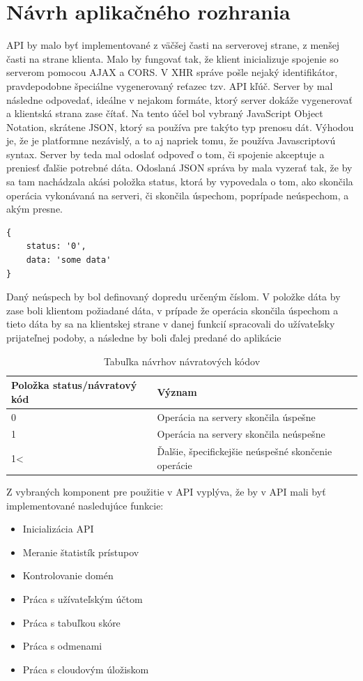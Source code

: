 \section{Návrh aplikačného rozhrania}
API by malo byť implementované z väčšej časti na serverovej strane, z menšej časti na strane klienta. Malo by fungovať tak, že klient inicializuje spojenie so serverom pomocou AJAX a CORS. V XHR správe pošle nejaký identifikátor, pravdepodobne špeciálne vygenerovaný reťazec tzv. API kľúč. Server by mal následne odpovedať, ideálne v nejakom formáte, ktorý server dokáže vygenerovať a klientská strana zase čítať. Na tento účel bol vybraný JavaScript Object Notation, skrátene JSON, ktorý sa používa pre takýto typ prenosu dát. Výhodou je, že je platformne nezávislý, a to aj napriek tomu, že používa Javascriptovú syntax. Server by teda mal odoslať odpoveď o tom, či spojenie akceptuje a preniesť ďalšie potrebné dáta. Odoslaná JSON správa by mala vyzerať tak, že by sa tam nachádzala akási položka status, ktorá by vypovedala o tom, ako skončila operácia vykonávaná na serveri, či skončila úspechom, poprípade neúspechom, a akým presne. 
\begin{lstlisting}[]
{
    status: '0',
    data: 'some data'
}
\end{lstlisting}
Daný neúspech by bol definovaný dopredu určeným číslom. V položke dáta by zase boli klientom požiadané dáta, v prípade že operácia skončila úspechom a tieto dáta by sa na klientskej strane v danej funkcií spracovali do užívateľsky prijateľnej podoby, a následne by boli ďalej predané do aplikácie
\begin{table}[h]
\centering
\begin{tabular}{|l|l|l|}
\hline
Položka status/návratový kód & Význam \\ \hline
0 & Operácia na servery skončila úspešne \\ \hline
1 & Operácia na servery skončila neúspešne \\ \hline
1\textless & Ďalšie, špecifickejšie neúspešné skončenie operácie \\ \hline
\end{tabular}
\label{navratovekody}
\caption{Tabuľka návrhov návratových kódov}
\end{table}

Z vybraných komponent pre použitie v API vyplýva, že by v API mali byť implementované nasledujúce funkcie:
\begin{itemize}
\item Inicializácia API
\item Meranie štatistík prístupov
\item Kontrolovanie domén
\item Práca s užívateľským účtom
\item Práca s tabuľkou skóre
\item Práca s odmenami
\item Práca s cloudovým úložiskom
\end{itemize}

